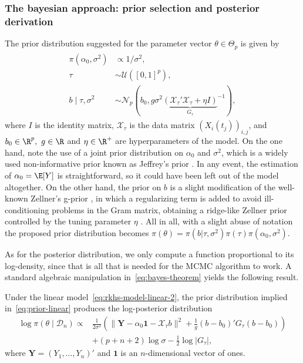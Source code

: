 \subsubsection{The bayesian approach: prior selection and posterior derivation}

The prior distribution suggested for the parameter vector \(\theta \in \Theta_p\) is given by
\begin{align}\label{eq:prior-linear}
  \begin{split}
  \pi(\alpha_0, \sigma^2)              & \propto 1/\sigma^2,                                                     \\
  \tau                     & \sim \mathcal U([0, 1]^p),                                              \\
  b\mid \tau, \sigma^2 & \sim \mathcal N_p(b_0, g\sigma^2{\underbrace{\left(\mathcal X_\tau' \mathcal X_\tau + \eta I\right)}_{G_\tau}}^{-1}),
\end{split}
\end{align}
where \(I\) is the identity matrix, \(\mathcal X_\tau\) is the data matrix \((X_i(t_j))_{i,j}\), and \(b_0\in \R^p, \ g \in \R\) and \(\eta \in \R^+\) are hyperparameters of the model. On the one hand, note the use of a joint prior distribution on \(\alpha_0\) and \(\sigma^2\), which is a widely used non-informative prior known as Jeffrey's prior \citep{jeffreys1946invariant}. In any event, the estimation of \(\alpha_0=\E[Y]\) is straightforward, so it could have been left out of the model altogether. On the other hand, the prior on \(b\) is a slight modification of the well-known Zellner's g-prior \citep{zellner1986assessing}, in which a regularizing term is added to avoid ill-conditioning problems in the Gram matrix, obtaining a ridge-like Zellner prior controlled by the tuning parameter \(\eta\) \citep{baragatti2012study}. All in all, with a slight abuse of notation the proposed prior distribution becomes \(\pi(\theta) = \pi(b| \tau, \sigma^2)\pi(\tau)\pi(\alpha_0, \sigma^2)\).

As for the posterior distribution, we only compute a function proportional to its log-density, since that is all that is needed for the MCMC algorithm to work. A standard algebraic manipulation in~\eqref{eq:bayes-theorem} yields the following result.

\begin{proposition}
Under the linear model~\eqref{eq:rkhs-model-linear-2}, the prior distribution implied in~\eqref{eq:prior-linear} produces the log-posterior distribution
\begin{align*}
\log \pi(\theta \mid \mathcal D_n) \propto {} & \frac{1}{2\sigma^2}\left(\|\symbf Y- \alpha_0\symbf{1} - \mathcal X_\tau b\|^2 + \frac{1}{g}(b - b_0)'G_\tau(b - b_0) \right)\\
& + (p+n+2)\log\sigma - \frac{1}{2}\log |G_\tau|,
\end{align*}
where \(\symbf Y=(Y_1,\dots,Y_n)'\) and \(\symbf{1}\) is an \(n\)-dimensional vector of ones.
\end{proposition}

